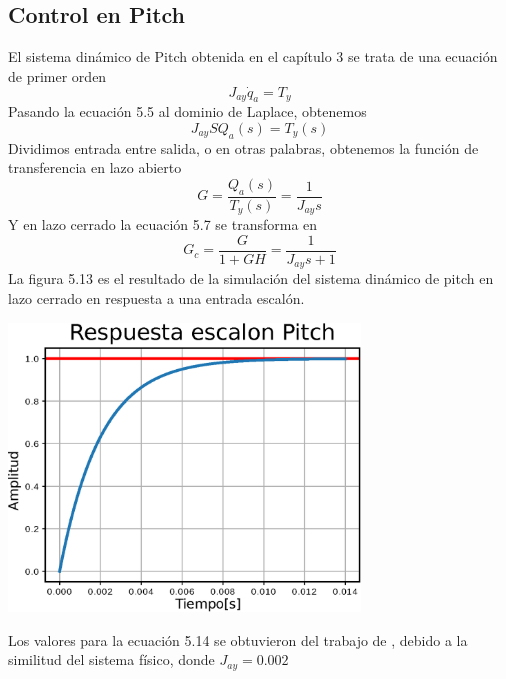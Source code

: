 \subsection{Control en Pitch}
El sistema dinámico de Pitch obtenida en el capítulo 3 se trata de una ecuación de primer orden
\begin{equation}
	J_{ay}\dot{q}_a = T_y
\end{equation}
Pasando la ecuación 5.5 al dominio de Laplace, obtenemos
\begin{equation}
	J_{ay}SQ_a(s) = T_y(s)
\end{equation}
Dividimos entrada entre salida, o en otras palabras, obtenemos la función de transferencia en lazo abierto
\begin{equation}
	G = \frac{Q_a(s)}{T_y(s)} =  \frac{1}{J_{ay}s}
\end{equation}
Y en lazo cerrado la ecuación 5.7 se transforma en
\begin{equation}
	G_c = \frac{G}{1 +GH} = \frac{1}{J_{ay}s+1}
\end{equation}
La figura 5.13 es el resultado de la simulación del sistema dinámico de pitch en lazo cerrado en respuesta a una entrada escalón.
\begin{center}
	\includegraphics[width=0.7\textwidth]{Contenido/Cuerpo/Capitulo5/Fig35.eps}
	\label{Fig4}
\end{center}
Los valores para la ecuación 5.14 se obtuvieron del trabajo de \cite{Paper::Abdo2013}, debido a la similitud del sistema físico, donde
$J_{ay} = 0.002$


